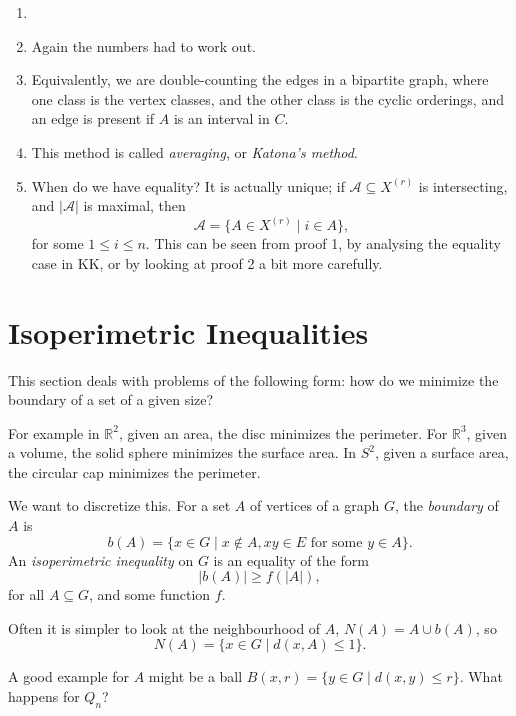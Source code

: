 \documentclass[12pt]{article}
\begin{document}
\begin{remark}
	\begin{enumerate}
		\item[]
		\item Again the numbers had to work out.
		\item Equivalently, we are double-counting the edges in a bipartite graph, where one class is the vertex classes, and the other  class is the cyclic orderings, and an edge is present if $A$ is an interval in $C$.
		\item This method is called \emph{averaging}, or \emph{Katona's method}.
		\item When do we have equality? It is actually unique; if $\mathcal{A} \subseteq X^{(r)}$ is intersecting, and $|\mathcal{A}|$ is maximal, then
			\[
				\mathcal{A} = \{A \in X^{(r)} \mid i \in A\},
			\]
			for some $1 \leq i \leq n$. This can be seen from proof 1, by analysing the equality case in KK, or by looking at proof 2 a bit more carefully.
	\end{enumerate}
	
\end{remark}


\newpage

\section{Isoperimetric Inequalities}%
\label{sec:ii}

This section deals with problems of the following form: how do we minimize the boundary of a set of a given size?

For example in $\mathbb{R}^2$, given an area, the disc minimizes the perimeter. For $\mathbb{R}^3$, given a volume, the solid sphere minimizes the surface area. In $S^2$, given a surface area, the circular cap minimizes the perimeter.

We want to discretize this. For a set $A$ of vertices of a graph $G$, the \emph{boundary} of $A$ is
\[
	b(A) = \{x \in G \mid x \not \in A, xy \in E \text{ for some }y \in A\}.
\]
An \emph{isoperimetric inequality} on $G$ is an equality of the form
\[
|b(A)| \geq f(|A|),
\]
for all $A \subseteq G$, and some function $f$.

Often it is simpler to look at the neighbourhood of $A$, $N(A) = A \cup b(A)$, so
\[
	N(A) = \{x \in G \mid d(x, A) \leq 1\}.
\]

A good example for $A$ might be a ball $B(x, r) = \{y \in G \mid d(x, y) \leq r\}$. What happens for $Q_n$?
\end{document}
